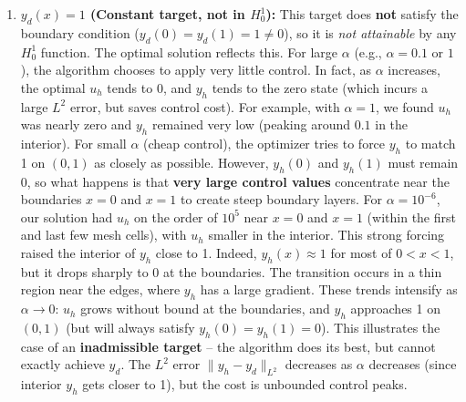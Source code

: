\documentclass[a4paper,10pt]{article}
\begin{document}
\begin{enumerate}
	\item \textbf{\(y_d(x)=1\) (Constant target, not in \(H^1_0\)):} This target does \textbf{not} satisfy the boundary condition (\(y_d(0)=y_d(1)=1\neq 0\)), so it is \textit{not attainable} by any \(H^1_0\) function. The optimal solution reflects this. For large \(\alpha\) (e.g., \(\alpha=0.1\) or \(1\)), the algorithm chooses to apply very little control. In fact, as \(\alpha\) increases, the optimal \(u_h\) tends to \(0\), and \(y_h\) tends to the zero state (which incurs a large \(L^2\) error, but saves control cost). For example, with \(\alpha=1\), we found \(u_h\) was nearly zero and \(y_h\) remained very low (peaking around \(0.1\) in the interior). For small \(\alpha\) (cheap control), the optimizer tries to force \(y_h\) to match 1 on \((0,1)\) as closely as possible. However, \(y_h(0)\) and \(y_h(1)\) must remain 0, so what happens is that \textbf{very large control values} concentrate near the boundaries \(x=0\) and \(x=1\) to create steep boundary layers. For \(\alpha=10^{-6}\), our solution had \(u_h\) on the order of \(10^5\) near \(x=0\) and \(x=1\) (within the first and last few mesh cells), with \(u_h\) smaller in the interior. This strong forcing raised the interior of \(y_h\) close to 1. Indeed, \(y_h(x)\approx 1\) for most of \(0<x<1\), but it drops sharply to \(0\) at the boundaries. The transition occurs in a thin region near the edges, where \(y_h\) has a large gradient. These trends intensify as \(\alpha\to 0\): \(u_h\) grows without bound at the boundaries, and \(y_h\) approaches 1 on \((0,1)\) (but will always satisfy \(y_h(0)=y_h(1)=0\)). This illustrates the case of an \textbf{inadmissible target} – the algorithm does its best, but cannot exactly achieve \(y_d\). The \(L^2\) error \(\|y_h-y_d\|_{L^2}\) decreases as \(\alpha\) decreases (since interior \(y_h\) gets closer to 1), but the cost is unbounded control peaks.


\end{enumerate}
\end{document}
